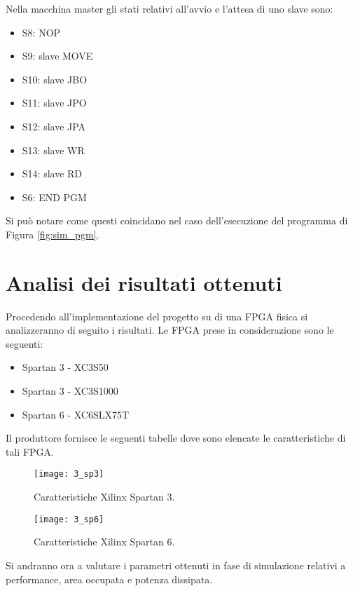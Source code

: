 Nella macchina master gli stati relativi all'avvio e l'attesa di uno slave sono:
\begin{itemize}
	\item S8: NOP
	\item S9: slave MOVE
	\item S10: slave JBO
	\item S11: slave JPO
	\item S12: slave JPA
	\item S13: slave WR
	\item S14: slave RD
	\item S6: END PGM
\end{itemize}
Si può notare come questi coincidano nel caso dell'esecuzione del programma di Figura \ref{fig:sim_pgm}.

\section{Analisi dei risultati ottenuti}
Procedendo all'implementazione del progetto su di una FPGA fisica si analizzeranno di seguito i risultati. Le FPGA prese in considerazione sono le seguenti:
\begin{itemize}
	\item Spartan 3 - XC3S50
	\item Spartan 3 - XC3S1000
	\item Spartan 6 - XC6SLX75T
\end{itemize}
Il produttore fornisce le seguenti tabelle dove sono elencate le caratteristiche di tali FPGA.
\begin{figure}[H]
	\centering
	\texttt{[image: 3\_sp3]}
	\caption{Caratteristiche Xilinx Spartan 3.}
	\label{fig:spartan3}
\end{figure}
\begin{figure}[H]
\centering
\texttt{[image: 3\_sp6]}
\caption{Caratteristiche Xilinx Spartan 6.}
\label{fig:spartan6}
\end{figure}
Si andranno ora a valutare i parametri ottenuti in fase di simulazione relativi a performance, area occupata e potenza dissipata.

